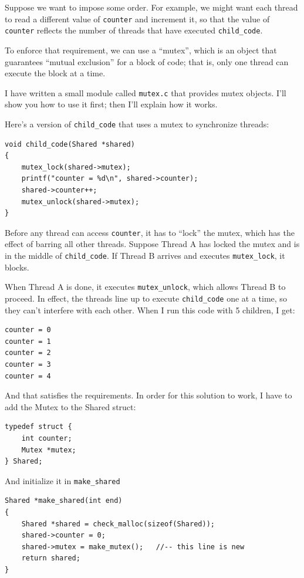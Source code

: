 \documentclass[12pt]{book}
\begin{document}
{Suppose we want to impose some order.  For example, we might want
each thread to read a different value of {\tt counter} and increment
it, so that the value of {\tt counter} reflects the number of
threads that have executed \verb"child_code".

To enforce that requirement, we can use a ``mutex'', which is
an object that guarantees ``mutual exclusion'' for a block of code;
that is, only one thread can execute the block at a time.

I have written a small module called {\tt mutex.c} that provides
mutex objects.  I'll show you how to use it first; then I'll explain
how it works.

Here's a version of \verb"child_code" that uses a mutex to synchronize
threads:

\begin{verbatim}
void child_code(Shared *shared)
{
    mutex_lock(shared->mutex);
    printf("counter = %d\n", shared->counter);
    shared->counter++;
    mutex_unlock(shared->mutex);
}
\end{verbatim}

Before any thread can access {\tt counter}, it has to ``lock''
the mutex, which has the effect of barring all other threads.
Suppose Thread A has locked the mutex and is in the
middle of \verb"child_code".  If Thread B arrives and
executes \verb"mutex_lock", it blocks.

When Thread A is done, it executes \verb"mutex_unlock",
which allows Thread B to proceed.  In effect, the threads
line up to execute \verb"child_code" one at a time, so they
can't interfere with each other.  When I run this code with
5 children, I get:

\begin{verbatim}
counter = 0
counter = 1
counter = 2
counter = 3
counter = 4
\end{verbatim}

And that satisfies the requirements.  In order for this solution to
work, I have to add the Mutex to the Shared struct:

\begin{verbatim}
typedef struct {
    int counter;
    Mutex *mutex;
} Shared;
\end{verbatim}

And initialize it in \verb"make_shared"

\begin{verbatim}
Shared *make_shared(int end)
{
    Shared *shared = check_malloc(sizeof(Shared));
    shared->counter = 0;
    shared->mutex = make_mutex();   //-- this line is new
    return shared;
}
\end{verbatim}

}
\end{document}

